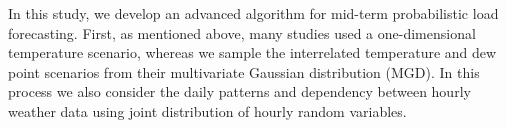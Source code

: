 \documentclass[journal]{IEEEtran} %
\begin{document}




In this study, we develop an advanced algorithm for mid-term probabilistic load forecasting. First, as mentioned above, many studies used a one-dimensional temperature scenario, whereas we sample the interrelated temperature and dew point  scenarios from their multivariate Gaussian distribution (MGD). In this process we also consider the daily patterns and dependency between hourly weather data using joint distribution of hourly random variables. %
\end{document}
